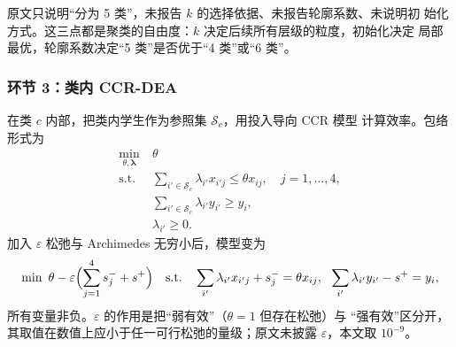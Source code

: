\begin{center}
\end{center}

原文只说明“分为 5 类”，未报告 $k$ 的选择依据、未报告轮廓系数、未说明初
始化方式。这三点都是聚类的自由度：$k$ 决定后续所有层级的粒度，初始化决定
局部最优，轮廓系数决定“5 类”是否优于“4 类”或“6 类”。

\subsubsection{环节 3：类内 CCR-DEA}

在类 $c$ 内部，把类内学生作为参照集 $\mathcal{S}_c$，用投入导向 CCR 模型
计算效率。包络形式为
\begin{equation}
\begin{aligned}
\min_{\theta,\bm{\lambda}}\ &\theta\\
\text{s.t.}\ &\sum_{i'\in\mathcal{S}_c}\lambda_{i'}x_{i'j}\le\theta x_{ij},
\quad j=1,\dots,4,\\
&\sum_{i'\in\mathcal{S}_c}\lambda_{i'}y_{i'}\ge y_i,\\
&\lambda_{i'}\ge 0 .
\end{aligned}
\label{eq:ccr}
\end{equation}
加入 $\varepsilon$ 松弛与 Archimedes 无穷小后，模型变为
\begin{equation}
\min\ \theta-\varepsilon\Bigl(\sum_{j=1}^{4}s_j^{-}+s^{+}\Bigr)
\quad\text{s.t.}\quad
\sum_{i'}\lambda_{i'}x_{i'j}+s_j^{-}=\theta x_{ij},\ \
\sum_{i'}\lambda_{i'}y_{i'}-s^{+}=y_i,
\label{eq:ccr-eps}
\end{equation}
所有变量非负。$\varepsilon$ 的作用是把“弱有效”（$\theta=1$ 但存在松弛）与
“强有效”区分开，其取值在数值上应小于任一可行松弛的量级；原文未披露
$\varepsilon$，本文取 $10^{-9}$。

